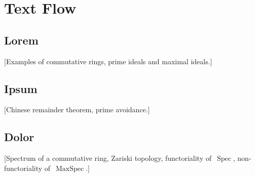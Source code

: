 \chapter{Text Flow}





\section{Lorem}

[Examples of commutative rings, prime ideals and maximal ideals.]

\lipsum






\section{Ipsum}

[Chinese remainder theorem, prime avoidance.]

\lipsum





\section{Dolor}

[Spectrum of a commutative ring, Zariski topology, functoriality of~$\operatorname{Spec}$, non-functoriality of~$\operatorname{MaxSpec}$.]

\lipsum
